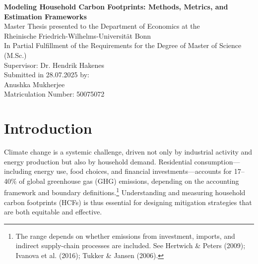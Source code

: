 \documentclass[12pt,a4paper]{article}%
\begin{document}
\begin{titlepage}
  \centering
  \vspace*{5cm}
  {\Huge \textbf{Modeling Household Carbon Footprints: Methods, Metrics, and Estimation Frameworks}}\\[2cm]
  {\large Master Thesis presented to the Department of Economics at the}\\
  {\large Rheinische Friedrich-Wilhelms-Universität Bonn}\\[1cm]
  {\large In Partial Fulfillment of the Requirements for the Degree of Master of Science (M.Sc.)}\\[2cm]
  Supervisor: Dr. Hendrik Hakenes \\[0.5cm]
  Submitted in 28.07.2025 by: \\[0.2cm]
  Anushka Mukherjee \\[0.2cm]
  Matriculation Number: 50075072
  \vfill
\end{titlepage}

\tableofcontents
\thispagestyle{empty}
\newpage

\setcounter{page}{1}


\section{Introduction}

Climate change is a systemic challenge, driven not only by industrial activity and energy production but also by household demand. Residential consumption—including energy use, food choices, and financial investments—accounts for 17--40\% of global greenhouse gas (GHG) emissions, depending on the accounting framework and boundary definitions.\footnote{The range depends on whether emissions from investment, imports, and indirect supply-chain processes are included. See Hertwich \& Peters (2009); Ivanova et al. (2016); Tukker \& Jansen (2006).} Understanding and measuring household carbon footprints (HCFs) is thus essential for designing mitigation strategies that are both equitable and effective.
\end{document}
